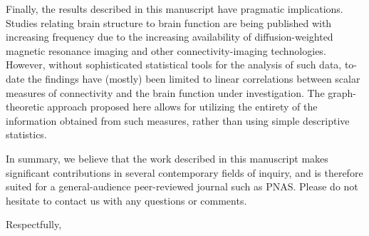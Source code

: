 \documentclass[10pt]{letter}
\begin{document}
\begin{letter}{	%
}
Finally, the results described in this manuscript have pragmatic implications. Studies relating brain structure to brain function are being published with increasing frequency due to the increasing availability of diffusion-weighted magnetic resonance imaging and other connectivity-imaging technologies. However, without sophisticated statistical tools for the analysis of such data, to-date the findings have (mostly) been limited to linear correlations between scalar measures of connectivity and the brain function under investigation. The graph-theoretic approach proposed here allows for utilizing the entirety of the information obtained from such measures, rather than using simple descriptive statistics.

In summary, we believe that the work described in this manuscript makes significant contributions in several contemporary fields of inquiry, and is therefore suited for a general-audience peer-reviewed journal such as PNAS. %
Please do not hesitate to contact us with any questions or comments.

\closing{Respectfully,}



\end{letter}
\end{document}
